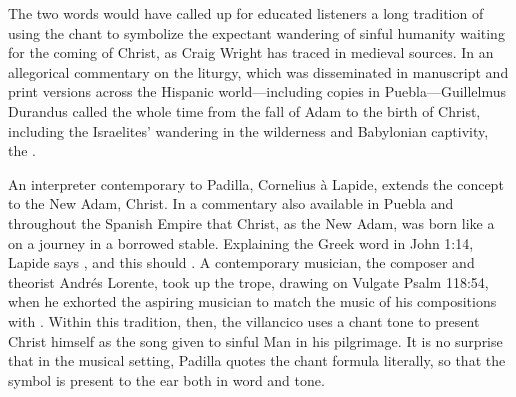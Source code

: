 The two words  would have called up for educated
listeners a long tradition of using the chant  to
symbolize the expectant wandering of sinful humanity waiting for the coming of
Christ, as Craig Wright has traced in medieval sources.
In an allegorical commentary on the liturgy, which was disseminated in
manuscript and print versions across the Hispanic world---including copies in
Puebla---Guillelmus Durandus called the whole time from the fall of Adam to the
birth of Christ, including the Israelites' wandering in the wilderness and
Babylonian captivity, the .%
    \Autocite[234]{Wright:Maze}

An interpreter contemporary to Padilla, Cornelius à Lapide, extends the
 concept to the New Adam, Christ.
In a commentary also available in Puebla and throughout the Spanish Empire that
Christ, as the New Adam, was born like a  on a journey in a
borrowed stable.
Explaining the Greek word  in John 1:14,
Lapide says , and
this should .%
    \Autocite
    [884: ; 
    669, on : ]
    {Lapide:Gospels19C}
A contemporary musician, the composer and theorist Andrés Lorente, took up  
the  trope, drawing on Vulgate Psalm 118:54, when he
exhorted the aspiring musician to match the music of his compositions with
.%
    \Autocite
    [609: ]
    {Lorente:Porque}
Within this tradition, then, the villancico uses a chant tone to present Christ
himself as the song given to sinful Man in his pilgrimage.
It is no surprise that in the musical setting, Padilla quotes the chant formula
literally, so that the symbol is present to the ear both in word and tone.

